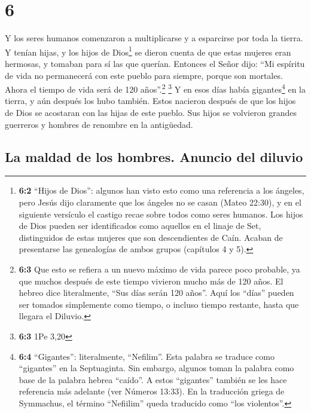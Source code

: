 \hypertarget{section-5}{%
\section{6}\label{section-5}}

 Y los seres humanos comenzaron a multiplicarse y a
esparcirse por toda la tierra. Y tenían hijas,  y los
hijos de Dios\footnote{\textbf{6:2} ``Hijos de Dios'': algunos han visto
  esto como una referencia a los ángeles, pero Jesús dijo claramente que
  los ángeles no se casan (Mateo 22:30), y en el siguiente versículo el
  castigo recae sobre todos como seres humanos. Los hijos de Dios pueden
  ser identificados como aquellos en el linaje de Set, distinguidos de
  estas mujeres que son descendientes de Caín. Acaban de presentarse las
  genealogías de ambos grupos (capítulos 4 y 5).} se dieron cuenta de
que estas mujeres eran hermosas, y tomaban para sí las que querían.
 Entonces el Señor dijo: ``Mi espíritu de vida no
permanecerá con este pueblo para siempre, porque son mortales. Ahora el
tiempo de vida será de 120 años''.\footnote{\textbf{6:3} Que esto se
  refiera a un nuevo máximo de vida parece poco probable, ya que muchos
  después de este tiempo vivieron mucho más de 120 años. El hebreo dice
  literalmente, ``Sus días serán 120 años''. Aquí los ``días'' pueden
  ser tomados simplemente como tiempo, o incluso tiempo restante, hasta
  que llegara el Diluvio.} \footnote{\textbf{6:3} 1Pe 3,20}
 Y en esos días había gigantes\footnote{\textbf{6:4}
  ``Gigantes'': literalmente, ``Nefilim''. Esta palabra se traduce como
  ``gigantes'' en la Septuaginta. Sin embargo, algunos toman la palabra
  como base de la palabra hebrea ``caído''. A estos ``gigantes'' también
  se les hace referencia más adelante (ver Números 13:33). En la
  traducción griega de Symmachus, el término ``Nefiilim'' queda
  traducido como ``los violentos''.} en la tierra, y aún después los
hubo también. Estos nacieron después de que los hijos de Dios se
acostaran con las hijas de este pueblo. Sus hijos se volvieron grandes
guerreros y hombres de renombre en la antigüedad.

\hypertarget{la-maldad-de-los-hombres.-anuncio-del-diluvio}{%
\subsection{La maldad de los hombres. Anuncio del
diluvio}\label{la-maldad-de-los-hombres.-anuncio-del-diluvio}}

